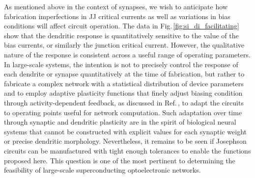 \documentclass[twocolumn]{article}
\begin{document}
As mentioned above in the context of synapses, we wish to anticipate how fabrication imperfections in JJ critical currents as well as variations in bias conditions will affect circuit operation. The data in Fig.\,\ref{fig:si_di_facilitating} show that the dendritic response is quantitatively sensitive to the value of the bias currents, or similarly the junction critical current. However, the qualitative nature of the response is consistent across a useful range of operating parameters. In large-scale systems, the intention is not to precisely control the response of each dendrite or synapse quantitatively at the time of fabrication, but rather to fabricate a complex network with a statistical distribution of device parameters and to employ adaptive plasticity functions that finely adjust biasing condition through activity-dependent feedback, as discussed in Ref.\,\cite{sh2018_full}, to adapt the circuits to operating points useful for network computation. Such adaptation over time through synaptic and dendritic plasticity are in the spirit of biological neural systems that cannot be constructed with explicit values for each synaptic weight or precise dendritic morphology. Nevertheless, it remains to be seen if Josephson circuits can be manufactured with tight enough tolerances to enable the functions proposed here. This question is one of the most pertinent to determining the feasibility of large-scale superconducting optoelectronic networks.
\end{document}
